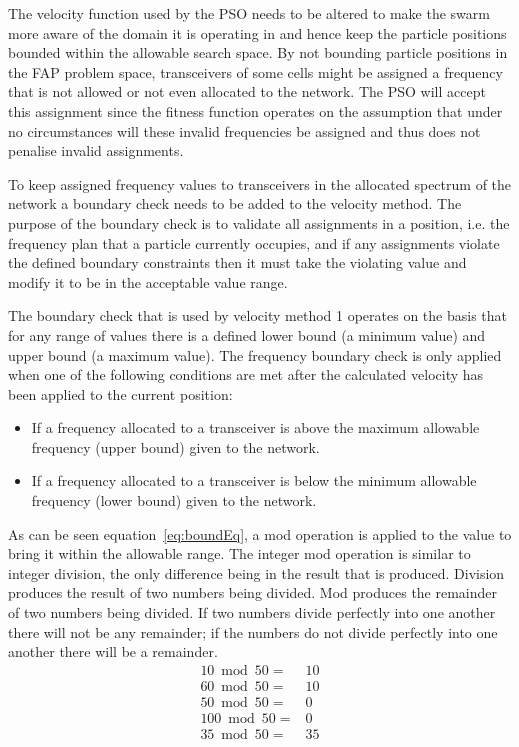 The velocity function used by the \gls{PSO} needs to be altered to make the swarm more aware of the domain it is operating in and hence keep the particle positions bounded within the allowable search space. By not bounding particle positions in the \gls{FAP} problem space, transceivers of some cells might be assigned a frequency that is not allowed or not even allocated to the network. The \gls{PSO} will accept this assignment since the fitness function operates on the assumption that under no circumstances will these invalid frequencies be assigned and thus does not penalise invalid assignments.

To keep assigned frequency values to transceivers in the allocated spectrum of the network a boundary check needs to be added to the velocity method. The purpose of the boundary check is to validate all assignments in a position, i.e. the frequency plan that a particle currently occupies, and if any assignments violate the defined boundary constraints then it must take the violating value and modify it to be in the acceptable value range.

The boundary check that is used by velocity method 1 operates on the basis that for any range of values there is a defined lower bound (a minimum value) and upper bound (a maximum value). The frequency boundary check is only applied when one of the following conditions are met after the calculated velocity has been applied to the current position:
\begin{itemize}
\item If a frequency allocated to a transceiver is above the maximum allowable frequency (upper bound) given to the network. 
\item If a frequency allocated to a transceiver is below the minimum allowable frequency (lower bound) given to the network.
\end{itemize}

As can be seen equation~\ref{eq:boundEq}, a mod operation is applied to the value to bring it within the allowable range. The integer mod operation is similar to integer division, the only difference being in the result that is produced. Division produces the result of two numbers being divided. Mod produces the remainder of two numbers being divided. If two numbers divide perfectly into one another there will not be any remainder; if the numbers do not divide perfectly into one another there will be a remainder. 
\begin{align}
	10 \bmod 50 =& 10 \nonumber \\
	60 \bmod 50 =& 10 \nonumber \\
	50 \bmod 50 =& 0 \nonumber \\
	100 \bmod 50 =& 0 \nonumber \\
	35 \bmod 50 =& 35 \nonumber 
\end{align}

